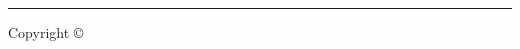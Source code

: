 \fi					%
%
%
%
\ifodd\usercopyright
\vspace*{-3ex}
\par\noindent
\rule{\hsize}{0.3mm}
%
{\small Copyright \copyright\  \usercopyrightext}
%
\fi					%
\endgroup
\clearpage
%
%
%
%
%
%
\thispagestyle{empty}
%
